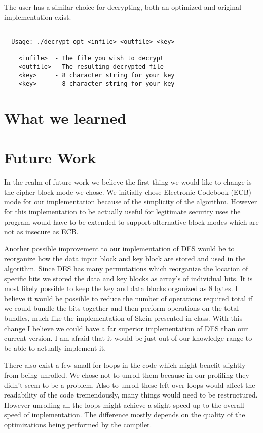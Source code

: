 \documentclass[10pt]{article}
\begin{document}
The user has a similar choice for decrypting, both an optimized and original implementation exist.
\begin{verbatim}

  Usage: ./decrypt_opt <infile> <outfile> <key>

    <infile>  - The file you wish to decrypt
    <outfile> - The resulting decrypted file
    <key>     - 8 character string for your key
    <key>     - 8 character string for your key

\end{verbatim}

\section{What we learned}

\section{Future Work}

  In the realm of future work we believe the first thing we would like to change is the cipher block mode we chose.
  We initially chose Electronic Codebook (ECB) mode for our implementation because of the simplicity of the algorithm.
  However for this implementation to be actually useful for legitimate security uses the program would have to be extended
  to support alternative block modes which are not as insecure as ECB.

  Another possible improvement to our implementation of DES would be to reorganize how the data input block and key block
  are stored and used in the algorithm. Since DES has many permutations which reorganize the location of specific bits we 
  stored the data and key blocks as array's of individual bits. It is most likely possible to keep the key and data blocks
  organized as 8 bytes. I believe it would be possible to reduce the number of operations required total if we could bundle the 
  bits together and then perform operations on the total bundles, much like the implementation of Skein presented in class. 
  With this change I believe we could have a far superior implementation of DES than our current version. I am afraid that it
  would be just out of our knowledge range to be able to actually implement it. 

  There also exist a few small for loops in the code which might benefit slightly from being unrolled.
  We chose not to unroll them because in our profiling they didn't seem to be a problem. Also to unroll
  these left over loops would affect the readability of the code tremendously, many things would need to be 
  restructured. However unrolling all the loops might achieve a slight speed up to the overall speed of implementation.
  The difference mostly depends on the quality of the optimizations being performed by the compiler.
\end{document}

